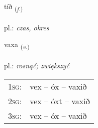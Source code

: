 \documentclass[frontgrid, backgrid]{flacards}\usepackage[]{graphicx}\usepackage[]{xcolor}
\begin{document}
\renewcommand{\flhead}{\vskip5pt \fboxsep=0pt {\small\bfseries\footnotesize Nafnorð | Noun}}
\renewcommand{\fcfoot}{\vskip5pt \fboxsep=0pt \hspace{2pt}{\small\bfseries\footnotesize 1K}}

\renewcommand{\blhead}{\vskip5pt {\small\bfseries\footnotesize Nafnorð | Noun }}
\renewcommand{\bcfoot}{\vskip5pt \hspace{2pt}{\small\bfseries\footnotesize 1K}}


{tíð \small{\textsubscript{(\textit{f.})}} \\[1ex] %
\textphonetic{[tʰiːð]} \\
pl.: \emph{czas, okres} \\  [2ex]
\renewcommand*{\arraystretch}{0.8}
}

\renewcommand{\flhead}{\vskip5pt \fboxsep=0pt {\small\bfseries\footnotesize Sagnorð | Verb}}
\renewcommand{\fcfoot}{\vskip5pt \fboxsep=0pt \hspace{2pt}{\small\bfseries\footnotesize 1K}}

\renewcommand{\blhead}{\vskip5pt {\small\bfseries\footnotesize Sagnorð | Verb }}
\renewcommand{\bcfoot}{\vskip5pt \hspace{2pt}{\small\bfseries\footnotesize 1K}}


{vaxa \small{\textsubscript{(\textit{v.})}} \\[1ex] %
\textphonetic{[vaksa]} \\
pl.: \emph{rosnąć; zwiększyć} \\  [2ex]
\renewcommand*{\arraystretch}{0.8}
\begin{tabular}{p{1cm}l}
\textsc{1sg}: & vex -- óx -- vaxið \\ 
\textsc{2sg}: & vex -- óxt -- vaxið \\ 
\textsc{3sg}: & vex -- óx -- vaxið \\ 
\end{tabular}
}
\end{document}
